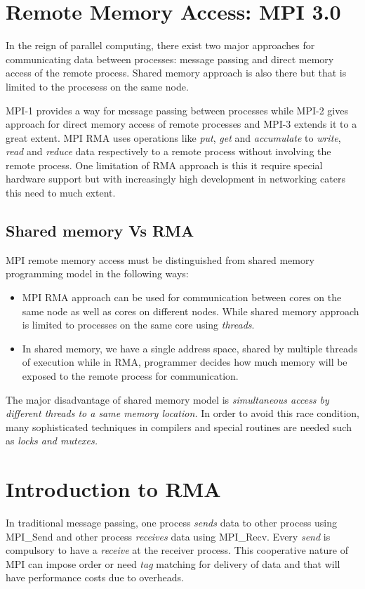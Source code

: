 \documentclass[12pt]{article}
\begin{document}
\section{Remote Memory Access: MPI 3.0}
In the reign of parallel computing, there exist two major approaches for communicating data between processes:
message passing and direct memory access of the remote process. Shared memory approach is also there but that 
is limited to the procesess on the same node. 

MPI-1 provides a way for message passing between processes while MPI-2 gives approach for direct memory access
of remote processes and MPI-3 extends it to a great extent. MPI RMA uses operations like \textit{put}, \textit{get}
and \textit{accumulate} to \textit{write}, \textit{read} and \textit{reduce} data respectively to a remote process 
without involving the remote process. One limitation of RMA approach is this it require special hardware support
but with increasingly high development in networking caters this need to much extent.

\subsection{Shared memory Vs RMA}
MPI remote memory access must be distinguished from shared memory programming model in the following ways:
\begin{itemize}
    \item MPI RMA approach can be used for communication between cores on the same node as well as cores on different
    nodes. While shared memory approach is limited to processes on the same core using \textit{threads}.
    \item In shared memory, we have a single address space, shared by multiple threads of execution while in RMA, programmer
    decides how much memory will be exposed to the remote process for communication. 
\end{itemize}
The major disadvantage of shared memory model is \textit{simultaneous access by different threads to a same memory location.}
In order to avoid this race condition, many sophisticated techniques in compilers and special routines are needed such as 
\textit{locks and mutexes.}

\section{Introduction to RMA}
In traditional message passing, one process \textit{sends} data to other process using {\ttfamily MPI\_Send} and other 
process \textit{receives} data using {\ttfamily MPI\_Recv}. Every \textit{send} is compulsory to have a \textit{receive}
at the receiver process. This cooperative nature of MPI can impose order or need \textit{tag} matching for delivery of data
and that will have performance costs due to overheads.
\end{document}
